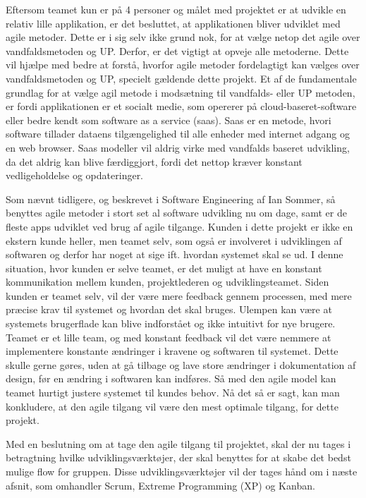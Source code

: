 Eftersom teamet kun er på 4 personer og målet med projektet er at udvikle en relativ lille applikation, er det besluttet, at applikationen bliver udviklet med agile metoder. Dette er i sig selv ikke grund nok, for at vælge netop det agile over vandfaldsmetoden og UP. Derfor, er det vigtigt at opveje alle metoderne. Dette vil hjælpe med bedre at forstå, hvorfor agile metoder fordelagtigt kan vælges over vandfaldsmetoden og UP, specielt gældende dette projekt. Et af de fundamentale grundlag for at vælge agil metode i modsætning til vandfalds- eller UP metoden, er fordi applikationen er et socialt medie, som opererer på cloud-baseret-software eller bedre kendt som software as a service (saas). Saas er en metode, hvori software tillader dataens tilgængelighed til alle enheder med internet adgang og en web browser.\cite{Sommerville} Saas modeller vil aldrig virke med vandfalds baseret udvikling, da det aldrig kan blive færdiggjort, fordi det nettop kræver konstant vedligeholdelse og opdateringer.

Som nævnt tidligere, og beskrevet i Software Engineering af Ian Sommer, så benyttes agile metoder i stort set al software udvikling nu om dage, samt er de fleste apps udviklet ved brug af agile tilgange\cite{Sommerville}.  Kunden i dette projekt er ikke en ekstern kunde heller, men teamet selv, som også er involveret i udviklingen af softwaren og derfor har noget at sige ift. hvordan systemet skal se ud. I denne situation, hvor kunden er selve teamet, er det muligt at have en konstant kommunikation mellem kunden, projektlederen og udviklingsteamet. Siden kunden er teamet selv, vil der være mere feedback gennem processen, med mere præcise krav til systemet og hvordan det skal bruges. Ulempen kan være at systemets brugerflade kan blive indforstået og ikke intuitivt for nye brugere. Teamet er et lille team, og med konstant feedback vil det være nemmere at implementere konstante ændringer i kravene og softwaren til systemet. Dette skulle gerne gøres, uden at gå tilbage og lave store ændringer i dokumentation af design, før en ændring i softwaren kan indføres. Så med den agile model kan teamet hurtigt justere systemet til kundes behov. Nå det så er sagt, kan man konkludere, at den agile tilgang vil være den mest optimale tilgang, for dette projekt.

Med en beslutning om at tage den agile tilgang til projektet, skal der nu tages i betragtning hvilke udviklingsværktøjer, der skal benyttes for at skabe det bedst mulige flow for gruppen. Disse udviklingsværktøjer vil der tages hånd om i næste afsnit, som omhandler Scrum, Extreme Programming (XP) og Kanban.
